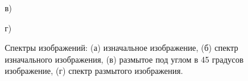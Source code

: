 \begin{figure}[H]
\begin{minipage}[h]{0.4\linewidth}
\end{minipage}
    \vfill
\begin{minipage}[h]{0.4\linewidth}
 в)\\ 
\end{minipage}
    \hfill
\begin{minipage}[h]{0.4\linewidth}
 г)\\
\end{minipage}

\caption{Спектры изображений: (а) изначальное изображение, (б) спектр изначального изображения, (в) размытое под углом в 45 градусов изображение, (г) спектр размытого изображения.}
\label{ris:sinc}
\end{figure}

